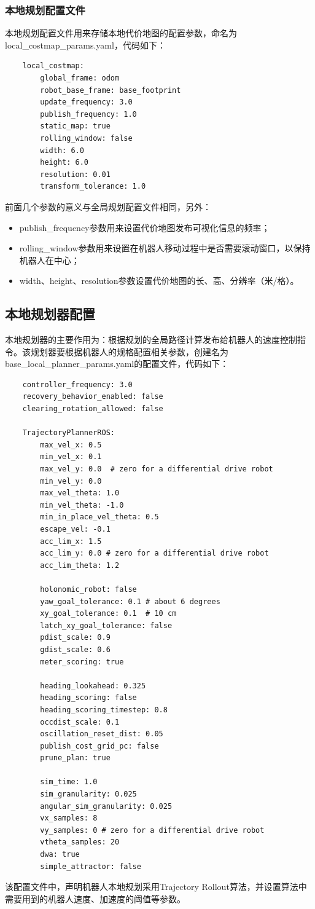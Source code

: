 \documentclass[10pt, oneside]{book}
\begin{document}
\subsubsection{本地规划配置文件}

本地规划配置文件用来存储本地代价地图的配置参数，命名为local\_costmap\_params.yaml，代码如下：

\begin{verbatim}
    local_costmap:
        global_frame: odom
        robot_base_frame: base_footprint
        update_frequency: 3.0
        publish_frequency: 1.0
        static_map: true
        rolling_window: false
        width: 6.0
        height: 6.0
        resolution: 0.01
        transform_tolerance: 1.0
\end{verbatim}

前面几个参数的意义与全局规划配置文件相同，另外：

\begin{itemize}
    \item publish\_frequency参数用来设置代价地图发布可视化信息的频率；
    \item rolling\_window参数用来设置在机器人移动过程中是否需要滚动窗口，以保持机器人在中心；
    \item width、height、resolution参数设置代价地图的长、高、分辨率（米/格）。
\end{itemize}

\subsection{本地规划器配置}

本地规划器的主要作用为：根据规划的全局路径计算发布给机器人的速度控制指令。该规划器要根据机器人的规格配置相关参数，创建名为base\_local\_planner\_params.yaml的配置文件，代码如下：

\begin{verbatim}
    controller_frequency: 3.0
    recovery_behavior_enabled: false
    clearing_rotation_allowed: false

    TrajectoryPlannerROS:
        max_vel_x: 0.5
        min_vel_x: 0.1
        max_vel_y: 0.0  # zero for a differential drive robot
        min_vel_y: 0.0
        max_vel_theta: 1.0
        min_vel_theta: -1.0
        min_in_place_vel_theta: 0.5
        escape_vel: -0.1
        acc_lim_x: 1.5
        acc_lim_y: 0.0 # zero for a differential drive robot
        acc_lim_theta: 1.2

        holonomic_robot: false
        yaw_goal_tolerance: 0.1 # about 6 degrees
        xy_goal_tolerance: 0.1  # 10 cm
        latch_xy_goal_tolerance: false
        pdist_scale: 0.9
        gdist_scale: 0.6
        meter_scoring: true

        heading_lookahead: 0.325
        heading_scoring: false
        heading_scoring_timestep: 0.8
        occdist_scale: 0.1
        oscillation_reset_dist: 0.05
        publish_cost_grid_pc: false
        prune_plan: true

        sim_time: 1.0
        sim_granularity: 0.025
        angular_sim_granularity: 0.025
        vx_samples: 8
        vy_samples: 0 # zero for a differential drive robot
        vtheta_samples: 20
        dwa: true
        simple_attractor: false
\end{verbatim}

该配置文件中，声明机器人本地规划采用Trajectory Rollout算法，并设置算法中需要用到的机器人速度、加速度的阈值等参数。
\end{document}
